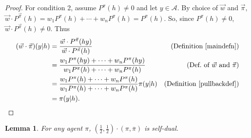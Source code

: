 \documentclass[twoside]{article}
\newtheorem{lemma}[theorem]{Lemma}
\begin{document}
\begin{proof}
        For condition 2,
        assume $P^\pi(h)\not=0$ and let $y\in\mathcal A$.
        By choice of $\vec w$ and $\vec\pi$,
        $\vec w\cdot{P^{\vec\pi}}(h)=w_1P^\pi(h)+\cdots+w_nP^\pi(h)=P^\pi(h)$.
        So, since $P^\pi(h)\not=0$, $\vec w\cdot{P^{\vec\pi}}(h)\not=0$.
        Thus
        \begin{align*}
            (\vec w\cdot\vec\pi)(y|h)
                &= \frac{\vec w\cdot {P^{\vec\pi}}(hy)}{\vec w\cdot{P^{\vec\pi}}(h)}
                    &\mbox{(Definition \ref{maindefn})}\\
                &= \frac{w_1P^\pi(hy)+\cdots+w_nP^\pi(hy)}
                    {w_1P^\pi(h)+\cdots+w_nP^\pi(h)}
                    &\mbox{(Def.\ of $\vec w$ and $\vec\pi$)}\\
                &= \frac{w_1P^\pi(h)+\cdots+w_nP^\pi(h)}{w_1P^\pi(h)+\cdots+w_nP^\pi(h)}
                    \pi(y|h)
                    &\mbox{(Definition \ref{pullbackdef})}\\
                &= \pi(y|h).
        \end{align*}
\end{proof}

\begin{lemma}
\label{reflectionmakesjanuslemma}
    For any agent $\pi$,
    $(\frac12,\frac12)\cdot(\pi,\overline\pi)$ is self-dual.
\end{lemma}
\end{document}

